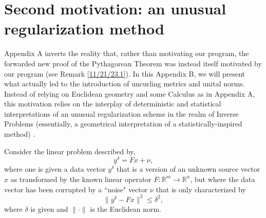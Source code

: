 \documentclass{amsart}
\numberwithin{equation}{section}
\theoremstyle{definition}
\numberwithin{theorem}{section}
\begin{document}
  \section{Second motivation: an unusual regularization method}
     Appendix A inverts the reality that, rather than motivating our program, the forwarded new proof of the Pythagorean Theorem was instead itself motivated by our program (see Remark \ref{11/21/23.1}). In this Appendix B, we will present what actually led to the introduction of uncurling metrics and unital norms.  Instead of relying on Euclidean geometry and some Calculus as in Appendix A, this motivation relies on the interplay of deterministic and statistical interpretations of an unusual regularization scheme in the realm of Inverse Problems (essentially, a geometrical interpretation of a statistically-inspired method) \cite{fgreensite:2022d}.
  
    
 Consider the linear problem described by, \begin{equation}\label{7/7/20.9}  y^\delta=Fx + \nu,\end{equation} where one is given a data vector $y^\delta$ that is a version of an unknown source vector $x$ as transformed by the known linear operator $F:\mathbb{R}^m\rightarrow\mathbb{R}^n$, but where the data vector has been corrupted by a ``noise" vector $\nu$ that is only characterized by \begin{equation}\label{7/12/20.1} \| y^\delta - Fx\|^2 \le \delta^2,\end{equation} where $\delta$ is given and $\|\cdot \|$ is the Euclidean norm.  
    
\end{document}
